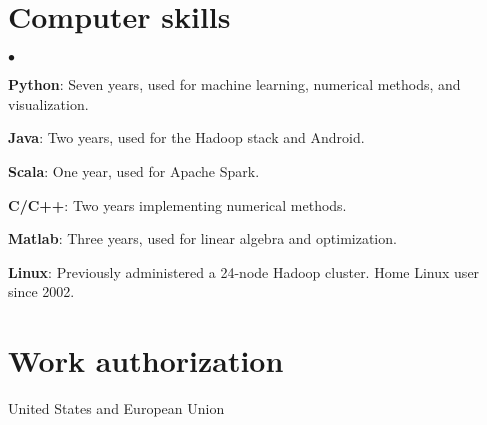 \documentclass[margin,line]{res}
\newenvironment{list2}{
  \begin{list}{$\bullet$}{%
      \setlength{\itemsep}{0in}
      \setlength{\parsep}{0in} \setlength{\parskip}{0in}
      \setlength{\topsep}{0in} \setlength{\partopsep}{0in}
      \setlength{\leftmargin}{0.2in}}}{\end{list}}
\begin{document}
\begin{resume}
\section{\sc Computer skills}
\begin{list2}
\item[]{\bf Python}: Seven years, used for machine learning, numerical methods, and visualization.
\item[]{\bf Java}: Two years, used for the Hadoop stack and Android.
\item[]{\bf Scala}: One year, used for Apache Spark.
\item[]{\bf C/C++}: Two years implementing numerical methods.
\item[]{\bf Matlab}: Three years, used for linear algebra and optimization.
\item[]{\bf Linux}: Previously administered a 24-node Hadoop cluster. Home Linux user since 2002.
\end{list2}

\section{\sc Work authorization}
United States and European Union

\end{resume}
\end{document}

